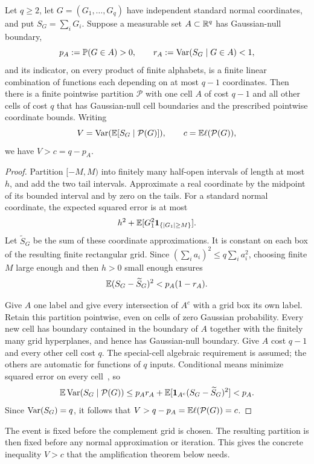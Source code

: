\begin{lemma}
\label{lem:refinement}
Let $q\ge2$, let $G=(G_1,\ldots,G_q)$ have independent standard normal
coordinates, and put $S_G=\sum_iG_i$.  Suppose a measurable set
$A\subset\mathbb R^q$ has Gaussian-null boundary,
\[
 p_A:=\mathbb P(G\in A)>0,\qquad
 r_A:=\operatorname{Var}(S_G\mid G\in A)<1,
\]
and its indicator, on every product of finite alphabets, is a finite
linear combination of functions each depending on at most $q-1$
coordinates.  Then there is a finite pointwise partition $\mathcal P$
with one cell $A$ of cost $q-1$ and all other cells of cost $q$ that
has Gaussian-null cell boundaries and the prescribed pointwise
coordinate bounds. Writing
\[
 V=\operatorname{Var}(\mathbb E[S_G\mid\mathcal P(G)]),\qquad
 c=\mathbb E\ell(\mathcal P(G)),
\]
we have $V>c=q-p_A$.
\end{lemma}

\begin{proof}
Partition $[-M,M)$ into finitely many half-open intervals of length
at most $h$, and add the two tail intervals.  Approximate a real
coordinate by the midpoint of its bounded interval and by zero on
the tails.  For a standard normal coordinate, the expected squared
error is at most
\[
 h^2+\mathbb E[G_1^2\mathbf 1_{\{|G_1|\ge M\}}].
\]
Let $\widetilde S_G$ be the sum of these coordinate approximations.
It is constant on each box of the resulting finite rectangular grid.
Since $(\sum_i a_i)^2\le q\sum_i a_i^2$, choosing finite $M$ large
enough and then $h>0$ small enough ensures
\[
 \mathbb E(S_G-\widetilde S_G)^2<p_A(1-r_A).
\]

Give $A$ one label and give every intersection of $A^c$ with a grid
box its own label.  Retain this partition pointwise, even on cells
of zero Gaussian probability.  Every new cell has boundary contained
in the boundary of $A$ together with the finitely many grid
hyperplanes, and hence has Gaussian-null boundary.
Give $A$ cost $q-1$ and every other cell cost $q$.  The special-cell
algebraic requirement is assumed; the others are automatic for
functions of $q$ inputs.  Conditional means minimize squared error
on every cell~\cite[Theorem~4.1.15]{Durrett}, so
\[
 \mathbb E\operatorname{Var}(S_G\mid\mathcal P(G))
 \le p_A r_A+
       \mathbb E[\mathbf 1_{A^c}(S_G-\widetilde S_G)^2]<p_A.
\]
Since $\operatorname{Var}(S_G)=q$, it follows that
$V>q-p_A=\mathbb E\ell(\mathcal P(G))=c$.
\end{proof}

The event is fixed before the complement grid is chosen. The resulting
partition is then fixed before any normal approximation or iteration.
This gives the concrete inequality $V>c$ that the amplification theorem
below needs.

